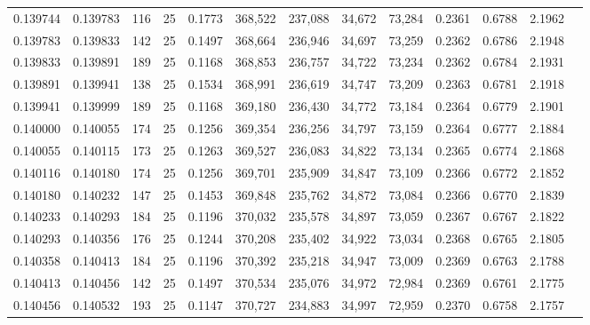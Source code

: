 \begin{tabular}{rrrrrrrrrrrrr}
0.139744 & 0.139783 &   116 &  25 &                                     0.1773 & 368,522 & 237,088 &  34,672 &  73,284 & 0.2361 & 0.6788 & 2.1962 \\
0.139783 & 0.139833 &   142 &  25 &                                     0.1497 & 368,664 & 236,946 &  34,697 &  73,259 & 0.2362 & 0.6786 & 2.1948 \\
0.139833 & 0.139891 &   189 &  25 &                                     0.1168 & 368,853 & 236,757 &  34,722 &  73,234 & 0.2362 & 0.6784 & 2.1931 \\
0.139891 & 0.139941 &   138 &  25 &                                     0.1534 & 368,991 & 236,619 &  34,747 &  73,209 & 0.2363 & 0.6781 & 2.1918 \\
0.139941 & 0.139999 &   189 &  25 &                                     0.1168 & 369,180 & 236,430 &  34,772 &  73,184 & 0.2364 & 0.6779 & 2.1901 \\
0.140000 & 0.140055 &   174 &  25 &                                     0.1256 & 369,354 & 236,256 &  34,797 &  73,159 & 0.2364 & 0.6777 & 2.1884 \\
0.140055 & 0.140115 &   173 &  25 &                                     0.1263 & 369,527 & 236,083 &  34,822 &  73,134 & 0.2365 & 0.6774 & 2.1868 \\
0.140116 & 0.140180 &   174 &  25 &                                     0.1256 & 369,701 & 235,909 &  34,847 &  73,109 & 0.2366 & 0.6772 & 2.1852 \\
0.140180 & 0.140232 &   147 &  25 &                                     0.1453 & 369,848 & 235,762 &  34,872 &  73,084 & 0.2366 & 0.6770 & 2.1839 \\
0.140233 & 0.140293 &   184 &  25 &                                     0.1196 & 370,032 & 235,578 &  34,897 &  73,059 & 0.2367 & 0.6767 & 2.1822 \\
0.140293 & 0.140356 &   176 &  25 &                                     0.1244 & 370,208 & 235,402 &  34,922 &  73,034 & 0.2368 & 0.6765 & 2.1805 \\
0.140358 & 0.140413 &   184 &  25 &                                     0.1196 & 370,392 & 235,218 &  34,947 &  73,009 & 0.2369 & 0.6763 & 2.1788 \\
0.140413 & 0.140456 &   142 &  25 &                                     0.1497 & 370,534 & 235,076 &  34,972 &  72,984 & 0.2369 & 0.6761 & 2.1775 \\
0.140456 & 0.140532 &   193 &  25 &                                     0.1147 & 370,727 & 234,883 &  34,997 &  72,959 & 0.2370 & 0.6758 & 2.1757 \\

\end{tabular}
